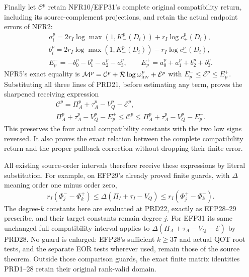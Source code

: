 Finally let $\mathcal C^p$ retain NFR10/EFP31's complete original
compatibility return, including its source-complement projections,
and retain the actual endpoint errors of NFR2:
\[
\begin{gathered}
 a_i^p=2r_I\log\max(1,K_-^p(D_i))+r_I\log c_+^p(D_i),\\
 b_i^p=2r_I\log\max(1,K_+^p(D_i))-r_I\log c_-^p(D_i),\\
 E_p^-=-b_0^p-b_1^p-a_2^p-a_3^p,\qquad
 E_p^+=a_0^p+a_1^p+b_2^p+b_3^p.
\end{gathered}                                                    \tag{PRD27}
\]
NFR5's exact equality is
$\mathcal M^p=\mathcal C^p+\mathcal R\log\omega_{\rm inv}^p
                  +\mathcal E^p$ with
$E_p^-\le\mathcal E^p\le E_p^+$.
Substituting all three lines of PRD21, before estimating any
term, proves the sharpened receiving expression
\[
\begin{gathered}
 \mathcal C^p=\Pi_A^p+\tau_A^p-V_Q^p-\mathcal E^p,\\
 \Pi_A^p+\tau_A^p-V_Q^p-E_p^+
 \le\mathcal C^p\le
 \Pi_A^p+\tau_A^p-V_Q^p-E_p^- .
\end{gathered}                                                    \tag{PRD28}
\]
This preserves the four actual compatibility constants with the
two low signs reversed. It also proves the exact relation
between the complete compatibility return and the proper
pullback correction without dropping their finite error.

All existing source-order intervals therefore receive these
expressions by literal substitution. For example, on EFP29's
already proved finite guards, with $\Delta$ meaning order one
minus order zero,
\[
 r_I(\Phi_j^- -\Phi_k^+)
 \le\Delta(\Pi_I+\tau_I-V_Q)
 \le r_I(\Phi_j^+ -\Phi_k^-).                           \tag{PRD29}
\]
The degree-$k$ constants here are evaluated at PRD22, exactly as
EFP28--29 prescribe, and their target constants remain degree $j$.
For EFP31 its same unchanged full compatibility interval applies
to $\Delta(\Pi_A+\tau_A-V_Q-\mathcal E)$ by PRD28.
No guard is enlarged: EFP28's sufficient $k\ge37$ and actual
QOT root tests, and the separate EOR tests wherever used, remain
those of the source theorem. Outside those comparison guards,
the exact finite matrix identities PRD1--28 retain their original
rank-valid domain.
\endgroup

\begingroup
